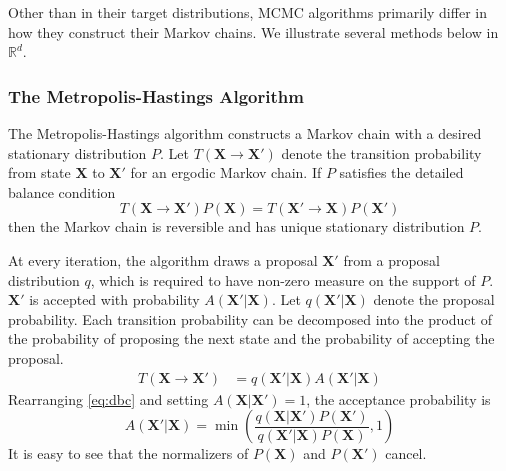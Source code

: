 \documentclass[a4paper,11pt]{article}
\begin{document}
Other than in their target distributions, MCMC algorithms primarily differ in how they construct their Markov chains. We illustrate several methods below in $\mathbb{R}^{d}$.

\subsubsection{The Metropolis-Hastings Algorithm}
The Metropolis-Hastings algorithm \cite{metropolis_equation_1953,hastings_monte_1970} constructs a Markov chain with a desired stationary distribution $P$. Let $T(\mathbf{X} \rightarrow \mathbf{X}')$ denote the transition probability from state $\mathbf{X}$ to $\mathbf{X'}$ for an ergodic Markov chain. If $P$ satisfies the detailed balance condition
\begin{equation}
   T(\mathbf{X} \rightarrow \mathbf{X}') P(\mathbf{X}) = T(\mathbf{X}' \rightarrow \mathbf{X}) P(\mathbf{X}')
   \label{eq:dbc}
\end{equation}
then the Markov chain is reversible and has unique stationary distribution $P$. 

At every iteration, the algorithm draws a proposal $\mathbf{X}'$ from a proposal distribution $q$, which is required to have non-zero measure on the support of $P$. $\mathbf{X}'$ is accepted with probability $A(\mathbf{X}'|\mathbf{X})$. Let $q(\mathbf{X}'|\mathbf{X})$ denote the proposal probability. Each transition probability can be decomposed into the product of the probability of proposing the next state and the probability of accepting the proposal.
\begin{align*}
    T(\mathbf{X} \rightarrow \mathbf{X}') &= q(\mathbf{X}'|\mathbf{X}) A(\mathbf{X}'|\mathbf{X})
\end{align*}
Rearranging \eqref{eq:dbc} and setting  $A(\mathbf{X}|\mathbf{X}')=1$, the acceptance probability is
\begin{equation}
    A(\mathbf{X}'|\mathbf{X}) = \min{\left(\frac{q(\mathbf{X}|\mathbf{X}')  P(\mathbf{X}') }{q(\mathbf{X}'|\mathbf{X})  P(\mathbf{X})}, 1\right)}
    \label{eq:mh_acceptance}
\end{equation}
It is easy to see that the normalizers of $P(\mathbf{X})$ and $P(\mathbf{X}')$ cancel.
\end{document}

